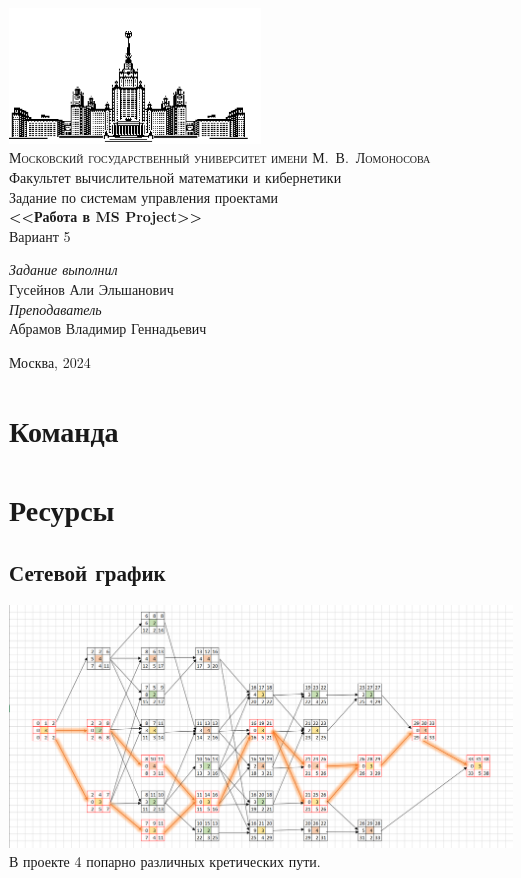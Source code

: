 \documentclass[14pt]{article}
\begin{document}
\thispagestyle{empty}
\begin{center}
	\ \vspace{-4cm}\\
	\includegraphics[width=0.5\textwidth]{../img/msu.png}\\
	{\scshape Московский государственный университет имени М.~В.~Ломоносова}\\
	Факультет вычислительной  математики и кибернетики\\
	\vfill
	{\LARGE Задание по системам управления проектами}\\
	\vspace{1cm}
	{\Huge\bfseries <<Работа в MS Project>>}\\
	{\Huge Вариант 5} 
\end{center}
\vspace{1cm}
\begin{flushright}
	\large
	\textit{Задание выполнил}\\
	Гусейнов Али Эльшанович\\
	\vspace{5mm}
	\textit{Преподаватель}\\
	Абрамов Владимир Геннадьевич
\end{flushright}
\vfill
\begin{center}
	Москва, 2024
\end{center}
\clearpage
\tableofcontents
\clearpage
\section{Команда}
\section{Ресурсы}
	\subsection{Сетевой график}
	\includegraphics[width=\textwidth]{../img/init_network_graph.png}\\
	В проекте 4 попарно различных кретических пути.
\end{document}
